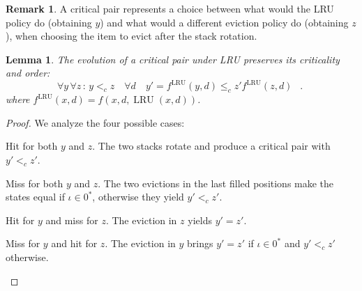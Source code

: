 \documentclass[11pt,a4paper]{article}
\DeclareMathOperator{\lru}{LRU}
\DeclareMathOperator{\mf}{\enspace .}
\newtheorem{lemma}{Lemma}
\theoremstyle{definition}
\newtheorem{remark}{Remark}
\theoremstyle{remark}
\begin{document}
\begin{remark}
A critical pair represents a choice between what would the LRU policy
do (obtaining $y$) and what would a different eviction policy do
(obtaining $z$), when choosing the item to evict after the stack
rotation.
\end{remark}
\begin{lemma}\label{lem:critp}
  The evolution of a critical pair under LRU preserves its criticality
  and order:
  \begin{equation}
    \forall y \, \forall z \, :\,  y <_c z \quad \forall d \quad 
    y' = f^{\lru}(y,d) \leq_c z' f^{\lru}(z,d) \mf
  \end{equation}
where $f^{\lru}(x,d)=f(x,d,\lru(x,d))$.
\end{lemma}
\begin{proof}
    We analyze the four possible cases:
  \begin{compactitem}
  \item Hit for both $y$ and $z$. The two stacks rotate and produce a critical
    pair with $y' <_c z'$.
  \item Miss for both $y$ and $z$. The two evictions in the last filled
    positions make the states equal if $\iota \in 0^*$, otherwise they yield $y'
    <_c z'$.
  \item Hit for $y$ and miss for $z$. The eviction in $z$ yields $y'=z'$.
  \item Miss for $y$ and hit for $z$. The eviction in $y$ brings $y'=z'$ if
    $\iota \in 0^*$ and $y' <_c z'$ otherwise.
  \end{compactitem}
\end{proof}
\end{document}
